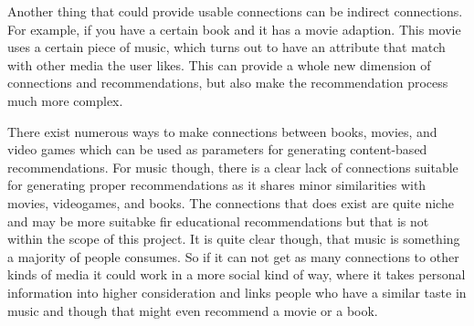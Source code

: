 Another thing that could provide usable connections can be indirect connections. For example, if you have a certain book and it has a movie adaption. This movie uses a certain piece of music, which turns out to have an attribute that match with other media the user likes. This can provide a whole new dimension of connections and recommendations, but also make the recommendation process much more complex.

There exist numerous ways to make connections between books, movies, and video games which can be used as parameters for generating content-based recommendations. For music though, there is a clear lack of connections suitable for generating proper recommendations as it shares minor similarities with movies, videogames, and books. The connections that does exist are quite niche and may be more suitabke fir educational recommendations but that is not within the scope of this project. It is quite clear though, that music is something a majority of people consumes. So if it can not get as many connections to other kinds of media it could work in a more social kind of way, where it takes personal information into higher consideration and links people who have a similar taste in music and though that might even recommend a movie or a book.